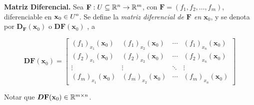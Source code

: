 \begin{definition}\label{def:mat_dif}\textbf{Matriz Diferencial.}  Sea $\mathbf{F}:U\subseteq\mathbb{R}^n\to\mathbb{R}^m$,  con $\mathbf{F}=(f_1, f_2, \dots, f_m)$,  diferenciable en $\mathbf{x}_0\in{\kern0ptU}^{\mathrm{o}}$. Se define la \emph{matriz diferencial de $\mathbf{F}$ en $\mathbf{x}_0$}, y se denota por $\boldsymbol{D}_{\mathbf{F}}(\mathbf{x}_0)$ o $\boldsymbol{D}{\mathbf{F}} (\mathbf{x}_0)$ , a
 

\[
 \boldsymbol{D}{\mathbf{F}} (\mathbf{x}_0) =
   \begin{bmatrix} 
      (f_1)_{x_1}(\mathbf{x}_0) & (f_1)_{x_2}(\mathbf{x}_0) & \cdots & (f_1)_{x_n}(\mathbf{x}_0) \\
      (f_2)_{x_1}(\mathbf{x}_0) & (f_2)_{x_2}(\mathbf{x}_0) & \cdots & (f_2)_{x_n}(\mathbf{x}_0) \\
      \vdots                    & \vdots                    & \ddots & \vdots                    \\
      (f_m)_{x_1}(\mathbf{x}_0) & (f_m)_{x_2}(\mathbf{x}_0) & \cdots & (f_m)_{x_n}(\mathbf{x}_0)
    \end{bmatrix}
\]  
\end{definition}


\begin{obs}
Notar que $\boldsymbol{D}{\mathbf{F}} (\mathbf{x}_0)    \in\mathbb{R}^{m\times n}$.
\end{obs}



